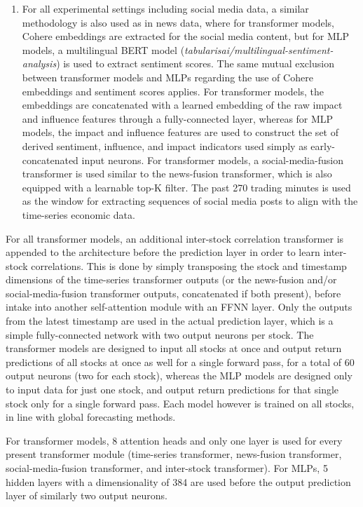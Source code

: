 \documentclass[stu,floatsintext]{apa7}
\begin{document}
\begin{enumerate}
\item For all experimental settings including social media data, a similar methodology is also used as in news data, where for transformer models, Cohere embeddings are extracted for the social media content, but for MLP models, a multilingual BERT model (\textit{tabularisai/multilingual-sentiment-analysis}) is used to extract sentiment scores. The same mutual exclusion between transformer models and MLPs regarding the use of Cohere embeddings and sentiment scores applies. For transformer models, the embeddings are concatenated with a learned embedding of the raw impact and influence features through a fully-connected layer, whereas for MLP models, the impact and influence features are used to construct the set of derived sentiment, influence, and impact indicators used simply as early-concatenated input neurons. For transformer models, a social-media-fusion transformer is used similar to the news-fusion transformer, which is also equipped with a learnable top-K filter. The past 270 trading minutes is used as the window for extracting sequences of social media posts to align with the time-series economic data.
\end{enumerate}
For all transformer models, an additional inter-stock correlation transformer is appended to the architecture before the prediction layer in order to learn inter-stock correlations. This is done by simply transposing the stock and timestamp dimensions of the time-series transformer outputs (or the news-fusion and/or social-media-fusion transformer outputs, concatenated if both present), before intake into another self-attention module with an FFNN layer. Only the outputs from the latest timestamp are used in the actual prediction layer, which is a simple fully-connected network with two output neurons per stock. The transformer models are designed to input all stocks at once and output return predictions of all stocks at once as well for a single forward pass, for a total of 60 output neurons (two for each stock), whereas the MLP models are designed only to input data for just one stock, and output return predictions for that single stock only for a single forward pass. Each model however is trained on all stocks, in line with global forecasting methods.

For transformer models, 8 attention heads and only one layer is used for every present transformer module (time-series transformer, news-fusion transformer, social-media-fusion transformer, and inter-stock transformer). For MLPs, 5 hidden layers with a dimensionality of 384 are used before the output prediction layer of similarly two output neurons.
\end{document}
